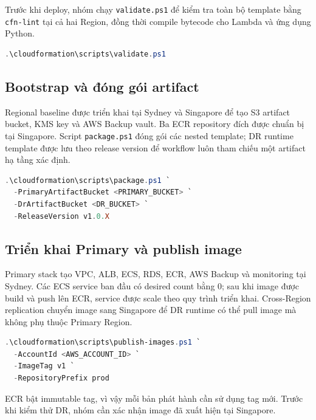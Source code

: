 Trước khi deploy, nhóm chạy \texttt{validate.ps1} để kiểm tra toàn bộ template bằng \texttt{cfn-lint} tại cả hai Region, đồng thời compile bytecode cho Lambda và ứng dụng Python.

\begin{lstlisting}[language=PowerShell,caption={Kiểm tra template và mã nguồn},label={lst:validate}]
.\cloudformation\scripts\validate.ps1
\end{lstlisting}

\subsection{Bootstrap và đóng gói artifact}

Regional baseline được triển khai tại Sydney và Singapore để tạo S3 artifact bucket, KMS key và AWS Backup vault. Ba ECR repository đích được chuẩn bị tại Singapore. Script \texttt{package.ps1} đóng gói các nested template; DR runtime template được lưu theo release version để workflow luôn tham chiếu một artifact hạ tầng xác định.

\begin{lstlisting}[language=PowerShell,caption={Đóng gói nested template},label={lst:package}]
.\cloudformation\scripts\package.ps1 `
  -PrimaryArtifactBucket <PRIMARY_BUCKET> `
  -DrArtifactBucket <DR_BUCKET> `
  -ReleaseVersion v1.0.X
\end{lstlisting}

\subsection{Triển khai Primary và publish image}

Primary stack tạo VPC, ALB, ECS, RDS, ECR, AWS Backup và monitoring tại Sydney. Các ECS service ban đầu có desired count bằng 0; sau khi image được build và push lên ECR, service được scale theo quy trình triển khai. Cross-Region replication chuyển image sang Singapore để DR runtime có thể pull image mà không phụ thuộc Primary Region.

\begin{lstlisting}[language=PowerShell,caption={Publish image ứng dụng},label={lst:images}]
.\cloudformation\scripts\publish-images.ps1 `
  -AccountId <AWS_ACCOUNT_ID> `
  -ImageTag v1 `
  -RepositoryPrefix prod
\end{lstlisting}

ECR bật immutable tag, vì vậy mỗi bản phát hành cần sử dụng tag mới. Trước khi kiểm thử DR, nhóm cần xác nhận image đã xuất hiện tại Singapore.

